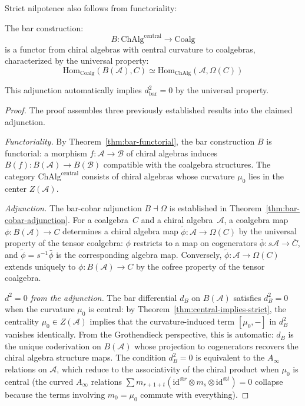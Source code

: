 Strict nilpotence also follows from functoriality:

\begin{theorem}\label{thm:bar-functorial-grothendieck}
The bar construction:
\[B: \mathrm{ChAlg}^{\mathrm{central}} \to \mathrm{Coalg}\]
is a functor from chiral algebras with central curvature to coalgebras, characterized by the
universal property:
\[\mathrm{Hom}_{\mathrm{Coalg}}(B(\mathcal{A}), C) \simeq \mathrm{Hom}_{\mathrm{ChAlg}}(\mathcal{A},
\Omega(C))\]

This adjunction automatically implies $d_{\mathrm{bar}}^2 = 0$ by the universal property.
\end{theorem}

\begin{proof}
The proof assembles three previously established results into the claimed adjunction.

\emph{Functoriality.}
By Theorem~\ref{thm:bar-functorial}, the bar construction $B$ is functorial: a morphism $f: \mathcal{A} \to \mathcal{B}$ of chiral algebras induces $B(f): B(\mathcal{A}) \to B(\mathcal{B})$ compatible with the coalgebra structures.  The category $\mathrm{ChAlg}^{\mathrm{central}}$ consists of chiral algebras whose curvature $\mu_0$ lies in the center $Z(\mathcal{A})$.

\emph{Adjunction.}
The bar-cobar adjunction $B \dashv \Omega$ is established in Theorem~\ref{thm:bar-cobar-adjunction}.  For a coalgebra~$C$ and a chiral algebra~$\mathcal{A}$, a coalgebra map $\phi: B(\mathcal{A}) \to C$ determines a chiral algebra map $\tilde{\phi}: \mathcal{A} \to \Omega(C)$ by the universal property of the tensor coalgebra: $\phi$ restricts to a map on cogenerators $\bar{\phi}: s\mathcal{A} \to \bar{C}$, and $\tilde{\phi} = s^{-1}\bar{\phi}$ is the corresponding algebra map.  Conversely, $\tilde{\phi}: \mathcal{A} \to \Omega(C)$ extends uniquely to $\phi: B(\mathcal{A}) \to C$ by the cofree property of the tensor coalgebra.

\emph{$d^2 = 0$ from the adjunction.}
The bar differential $d_B$ on $B(\mathcal{A})$ satisfies $d_B^2 = 0$ when the curvature $\mu_0$ is central: by Theorem~\ref{thm:central-implies-strict}, the centrality $\mu_0 \in Z(\mathcal{A})$ implies that the curvature-induced term $[\mu_0, -]$ in $d_B^2$ vanishes identically.  From the Grothendieck perspective, this is automatic: $d_B$ is the unique coderivation on $B(\mathcal{A})$ whose projection to cogenerators recovers the chiral algebra structure maps.  The condition $d_B^2 = 0$ is equivalent to the $A_\infty$ relations on $\mathcal{A}$, which reduce to the associativity of the chiral product when $\mu_0$ is central (the curved $A_\infty$ relations $\sum m_{r+1+t}(\mathrm{id}^{\otimes r} \otimes m_s \otimes \mathrm{id}^{\otimes t}) = 0$ collapse because the terms involving $m_0 = \mu_0$ commute with everything).
\end{proof}

